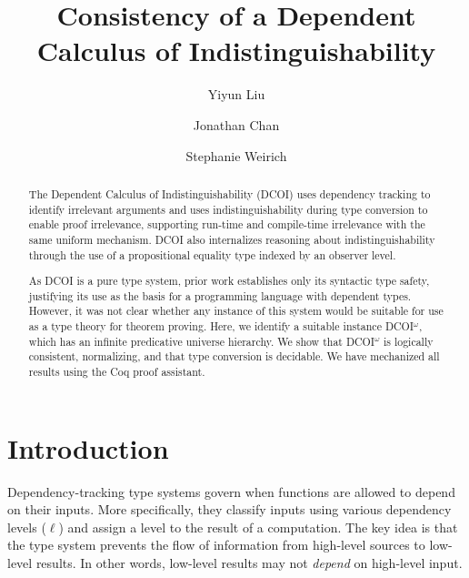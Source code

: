 \documentclass[acmsmall]{acmart}
\theoremstyle{linked}
\theoremstyle{deflinked}
\theoremstyle{acmdefinition}
\begin{document}
\title{Consistency of a Dependent Calculus of Indistinguishability}

\author{Yiyun Liu}

\author{Jonathan Chan}

\author{Stephanie Weirich}

\setlength{\jot}{0pt}

\begin{abstract}
  The Dependent Calculus of Indistinguishability (DCOI) uses dependency
  tracking to identify irrelevant arguments and uses indistinguishability
  during type conversion to enable proof irrelevance, supporting run-time and
  compile-time irrelevance with the same uniform mechanism. DCOI also
  internalizes reasoning about indistinguishability through the use of a
  propositional equality type indexed by an observer level.

  As DCOI is a pure type system, prior work establishes only its syntactic
  type safety, justifying its use as the basis for a programming language with
  dependent types.  However, it was not clear whether any instance of this
  system would be suitable for use as a type theory for theorem proving.
  Here, we identify a suitable instance DCOI$^\omega$, which has an infinite
  predicative universe hierarchy. We show that DCOI$^\omega$ is logically consistent,
  normalizing, and that type conversion is decidable. We have
  mechanized all results using the Coq proof assistant.
\end{abstract}

\maketitle

\section{Introduction}

Dependency-tracking type systems govern when functions are allowed to depend
on their inputs. More specifically, they classify inputs using various
dependency levels ($\ell$) and assign a level to the result of a
computation. The key idea is that the type system prevents the flow of
information from high-level sources to low-level results. In other words,
low-level results may not \emph{depend} on high-level input.
\end{document}
